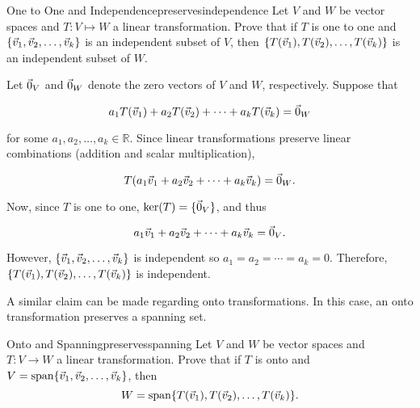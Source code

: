 \begin{example}{One to One and Independence}{preservesindependence}
Let $V$ and $W$ be vector spaces and $T: V \mapsto W$ a linear
transformation.
Prove that if $T$ is one to one and
$\{\vec{v}_1, \vec{v}_2, \ldots, \vec{v}_k\}$ is an independent
subset of $V$, then
$\{T(\vec{v}_1), T(\vec{v}_2), \ldots, T(\vec{v}_k)\}$ is an independent
subset of $W$.
\end{example}

\begin{solution}
Let $\vec{0}_V$ and $\vec{0}_W$ denote the zero vectors of $V$ and $W$,
respectively.
Suppose that 

\[ a_1T(\vec{v}_1) + a_2T(\vec{v}_2) +\cdots +a_kT(\vec{v}_k) =\vec{0}_W \]

for some $a_1, a_2, \ldots, a_k\in\mathbb{R}$.
Since linear transformations preserve linear combinations (addition
and scalar multiplication),

\[ T(a_1\vec{v}_1 + a_2\vec{v}_2 +\cdots +a_k\vec{v}_k) =\vec{0}_W. \]

Now, since $T$ is one to one, $\ker(T)=\{\vec{0}_V\}$, and thus

\[ a_1\vec{v}_1 + a_2\vec{v}_2 +\cdots +a_k\vec{v}_k =\vec{0}_V. \]

\noindent However, $\{\vec{v}_1, \vec{v}_2, \ldots, \vec{v}_k\}$ is independent so $a_1=a_2=\cdots=a_k=0$.
Therefore, $\{T(\vec{v}_1), T(\vec{v}_2), \ldots, T(\vec{v}_k)\}$
is independent.
\end{solution}

A similar claim can be made regarding onto transformations. In this case, an onto transformation preserves a spanning set.

\begin{example}{Onto and Spanning}{preservesspanning}
Let $V$ and $W$ be vector spaces and $T:V\to W$ a linear
transformation.
Prove that if $T$ is onto and
$V=\mbox{span}\{\vec{v}_1, \vec{v}_2, \ldots, \vec{v}_k\}$,
then
\[ W=\mbox{span}\{T(\vec{v}_1), T(\vec{v}_2), \ldots, T(\vec{v}_k)\}.\]
\end{example}

